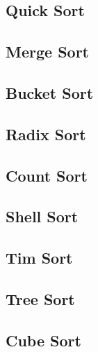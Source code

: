 \documentclass[12pt]{article}
\begin{document}
	\red{\lipsum[1]}
	
	\subsection*{Quick Sort}
	\label{sec:QSort}
	
	\red{\lipsum[1]}
	
	\subsection*{Merge Sort}
	\label{sec:MerSort}
	
	\red{\lipsum[1]}
	
	\subsection*{Bucket Sort}
	\label{sec:BuckSort}
	
	\red{\lipsum[1]}
	
	\subsection*{Radix Sort}
	\label{sec:RadSort}
	
	\red{\lipsum[1]}
	
	\subsection*{Count Sort}
	\label{sec:CntSort}
	
	\red{\lipsum[1]}
	
	\subsection*{Shell Sort}
	\label{sec:ShSort}
	
	\red{\lipsum[1]}
	
	\subsection*{Tim Sort}
	\label{sec:TimSort}
	
	\red{\lipsum[1]}
	
	\subsection*{Tree Sort}
	\label{sec:TrSort}
	
	\red{\lipsum[1]}
	
	\subsection*{Cube Sort}
	\label{sec:CubeSort}
	
	\red{\lipsum[1]}
\end{document}
